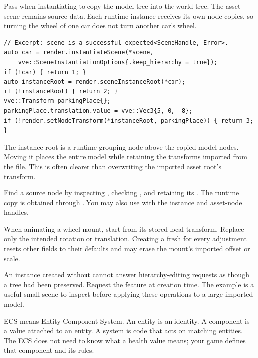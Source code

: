 \documentclass[11pt,a4paper]{article}
\begin{document}
Pass  when instantiating to copy the model tree into the world tree. The asset scene remains source data. Each runtime instance receives its own node copies, so turning the wheel of one car does not turn another car's wheel.
\begin{lstlisting}
// Excerpt: scene is a successful expected<SceneHandle, Error>.
auto car = render.instantiateScene(*scene,
    vve::SceneInstantiationOptions{.keep_hierarchy = true});
if (!car) { return 1; }
auto instanceRoot = render.sceneInstanceRoot(*car);
if (!instanceRoot) { return 2; }
vve::Transform parkingPlace{};
parkingPlace.translation.value = vve::Vec3{5, 0, -8};
if (!render.setNodeTransform(*instanceRoot, parkingPlace)) { return 3; }
\end{lstlisting}
The instance root is a runtime grouping node above the copied model nodes. Moving it places the entire model while retaining the transforms imported from the file. This is often clearer than overwriting the imported asset root's transform.

Find a source node by inspecting , checking , and retaining its . The runtime copy is obtained through . You may also use  with the instance and asset-node handles.

When animating a wheel mount, start from its stored local transform. Replace only the intended rotation or translation. Creating a fresh  for every adjustment resets other fields to their defaults and may erase the mount's imported offset or scale.

An instance created without  cannot answer hierarchy-editing requests as though a tree had been preserved. Request the feature at creation time. The  example is a useful small scene to inspect before applying these operations to a large imported model.

ECS means Entity Component System. An entity is an identity. A component is a value attached to an entity. A system is code that acts on matching entities. The ECS does not need to know what a health value means; your game defines that component and its rules.
\end{document}

